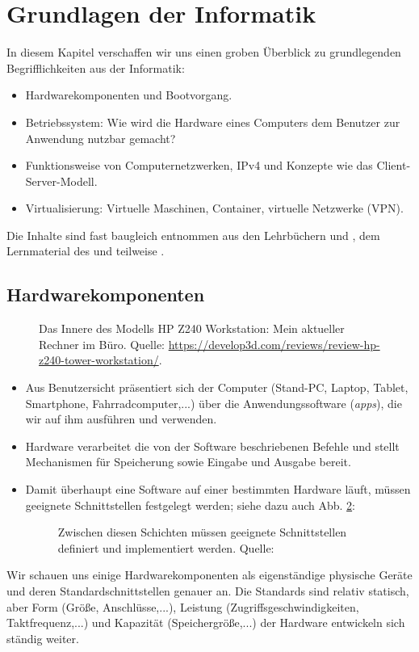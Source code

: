 \section{Grundlagen der Informatik} 
In diesem Kapitel verschaffen wir uns einen groben Überblick zu grundlegenden Begrifflichkeiten aus der Informatik:
\begin{itemize}
	\item Hardwarekomponenten und Bootvorgang.
	\item Betriebssystem:  Wie wird die Hardware eines Computers dem Benutzer zur Anwendung nutzbar gemacht?
	\item Funktionsweise von Computernetzwerken, IPv4 und Konzepte wie das Client-Server-Modell.
	\item Virtualisierung: Virtuelle Maschinen, Container, virtuelle Netzwerke (VPN).
\end{itemize}
Die Inhalte sind fast baugleich entnommen aus den Lehrbüchern \cite{gumm3} und \cite{gumm2}, dem Lernmaterial des  und teilweise .

%
%
%
\subsection{Hardwarekomponenten}
\begin{figure}[h!]
	\centering
	\caption[HP Z240 Workstation]{
	Das Innere des Modells HP Z240 Workstation: Mein aktueller Rechner im Büro. Quelle: \url{https://develop3d.com/reviews/review-hp-z240-tower-workstation/}.}
	\label{fig:hp-z240}
\end{figure}
\begin{itemize}
	\item Aus Benutzersicht präsentiert sich der Computer (Stand-PC, Laptop, Tablet, Smartphone, Fahrradcomputer,...) über die Anwendungssoftware (\textit{apps}), die wir auf ihm ausführen und verwenden.
	\item Hardware verarbeitet die von der Software beschriebenen Befehle und stellt Mechanismen für Speicherung sowie Eingabe und Ausgabe bereit. 
	\item Damit überhaupt eine Software auf einer bestimmten Hardware läuft, müssen geeignete Schnittstellen festgelegt werden; siehe dazu auch Abb. \ref{fig:betriebssystem}:
	\begin{figure}[h!]
		\centering
		\caption[Schnittstellen]{Zwischen diesen Schichten müssen geeignete Schnittstellen definiert und implementiert werden. Quelle: \cite[Abb. 1.25]{gumm2}}
		\label{fig:betriebssystem}
	\end{figure}
\end{itemize}
%
Wir schauen uns einige Hardwarekomponenten als eigenständige physische Geräte und deren Standardschnittstellen genauer an. Die Standards sind relativ statisch, aber Form (Größe, Anschlüsse,...), Leistung (Zugriffsgeschwindigkeiten, Taktfrequenz,...) und Kapazität (Speichergröße,...) der Hardware entwickeln sich ständig weiter.

